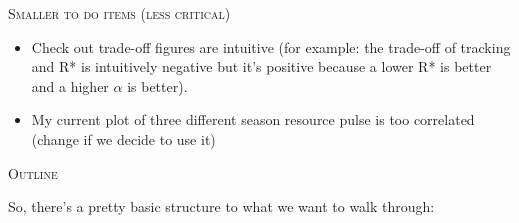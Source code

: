 \documentclass[11pt,letterpaper]{article}
\renewcommand{\section}[1]{%
\bigskip
\begin{center}
\begin{Large}
\normalfont\scshape #1
\medskip
\end{Large}
\end{center}}
\begin{document}
\section{Smaller to do items (less critical)} %
\begin{itemize}
\item Check out trade-off figures are intuitive (for example: the trade-off of tracking and R* is intuitively negative but it's positive because a lower R* is better and a higher $\alpha$ is better).
\item My current plot of three different season resource pulse is too correlated  (change if we decide to use it)
\end{itemize}

\section{Outline}
So, there's a pretty basic structure to what we want to walk through:
\end{document}
